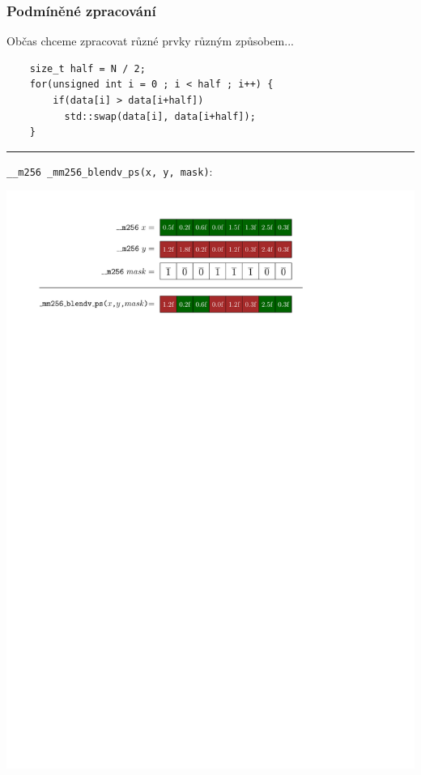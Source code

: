 \documentclass[usenames,dvipsnames,9pt]{beamer}
\begin{document}
\begin{frame}[fragile]
  \frametitle{Podmíněné zpracování}

  Občas chceme zpracovat různé prvky různým způsobem...
  \begin{verbatim}
    size_t half = N / 2;
    for(unsigned int i = 0 ; i < half ; i++) {
        if(data[i] > data[i+half])
          std::swap(data[i], data[i+half]);
    }
  \end{verbatim}

  \pause
  \vspace{1em}\hrule\vspace{1em}
  \texttt{__m256 _mm256_blendv_ps(x, y, mask)}:
  \begin{center}
    \includegraphics[width=0.95\linewidth]{figs/blendv.pdf}
  \end{center}
\end{frame}
\end{document}
